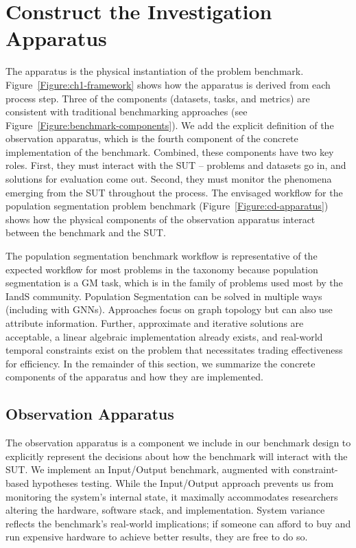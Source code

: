 \section{Construct the Investigation Apparatus}
\label{section:55-CD-Apparatus}

The apparatus is the physical instantiation of the problem benchmark.
Figure~\ref{Figure:ch1-framework} shows how the apparatus is derived from each process step. 
Three of the components (datasets, tasks, and metrics) are consistent with traditional benchmarking approaches (see Figure~\ref{Figure:benchmark-components}).
We add the explicit definition of the observation apparatus, which is the fourth component of the concrete implementation of the benchmark. 
Combined, these components have two key roles. 
First, they must interact with the \ac{SUT} -- problems and datasets go in, and solutions for evaluation come out.
Second, they must monitor the phenomena emerging from the \ac{SUT} throughout the process.
The envisaged workflow for the population segmentation problem benchmark (Figure~\ref{Figure:cd-apparatus}) shows how the physical components of the observation apparatus interact between the benchmark and the \ac{SUT}.

The population segmentation benchmark workflow is representative of the expected workflow for most problems in the \gai taxonomy because population segmentation is a \ac{GM} task, which is in the family of \gai problems used most by the \ac{IandS} community.
Population Segmentation can be solved in multiple ways (including with \ac{GNN}s). 
Approaches focus on graph topology but can also use attribute information.
Further, approximate and iterative solutions are acceptable, a linear algebraic implementation already exists, and real-world temporal constraints exist on the problem that necessitates trading effectiveness for efficiency. 
In the remainder of this section, we summarize the concrete components of the apparatus and how they are implemented.

\subsection{Observation Apparatus}
The observation apparatus is a component we include in our benchmark design to explicitly represent the decisions about how the benchmark will interact with the \ac{SUT}.
We implement an Input/Output benchmark, augmented with constraint-based hypotheses testing.
While the Input/Output approach prevents us from monitoring the system's internal state, it maximally accommodates researchers altering the hardware, software stack, and implementation.
System variance reflects the benchmark's real-world implications; if someone can afford to buy and run expensive hardware to achieve better results, they are free to do so.


